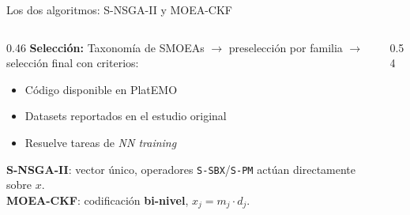\documentclass[aspectratio=169,10pt]{beamer}
\begin{document}
\begin{frame}{Los dos algoritmos: S-NSGA-II y MOEA-CKF}
  \begin{columns}[T]
    \begin{column}{0.46\textwidth}
      \small
      \textbf{Selección:} Taxonomía de SMOEAs $\to$ preselección por familia $\to$ selección final con criterios:
      \begin{itemize}
        \item Código disponible en PlatEMO
        \item Datasets reportados en el estudio original
        \item Resuelve tareas de \textit{NN training}
      \end{itemize}
      \vspace{4pt}
      \textbf{S-NSGA-II}: vector único, operadores \texttt{S-SBX}/\texttt{S-PM} actúan directamente sobre $x$.\\[4pt]
      \textbf{MOEA-CKF}: codificación \textbf{bi-nivel}, $x_j = m_j \cdot d_j$.
    \end{column}
    \begin{column}{0.54\textwidth}
      \centering
\end{column}
\end{columns}
\end{frame}
\end{document}
